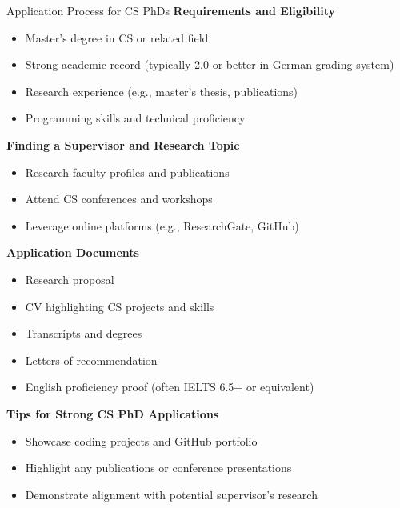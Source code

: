 \documentclass[aspectratio=169,10pt]{beamer}
\begin{document}
\begin{frame}{Application Process for CS PhDs}
    \textbf{Requirements and Eligibility}
    \begin{itemize}
        \item Master's degree in CS or related field
        \item Strong academic record (typically 2.0 or better in German grading system)
        \item Research experience (e.g., master's thesis, publications)
        \item Programming skills and technical proficiency
    \end{itemize}
    
    \textbf{Finding a Supervisor and Research Topic}
    \begin{itemize}
        \item Research faculty profiles and publications
        \item Attend CS conferences and workshops
        \item Leverage online platforms (e.g., ResearchGate, GitHub)
    \end{itemize}
    
    \textbf{Application Documents}
    \begin{itemize}
        \item Research proposal
        \item CV highlighting CS projects and skills
        \item Transcripts and degrees
        \item Letters of recommendation
        \item English proficiency proof (often IELTS 6.5+ or equivalent)
    \end{itemize}
    
    \textbf{Tips for Strong CS PhD Applications}
    \begin{itemize}
        \item Showcase coding projects and GitHub portfolio
        \item Highlight any publications or conference presentations
        \item Demonstrate alignment with potential supervisor's research
    \end{itemize}
\end{frame}
\end{document}
